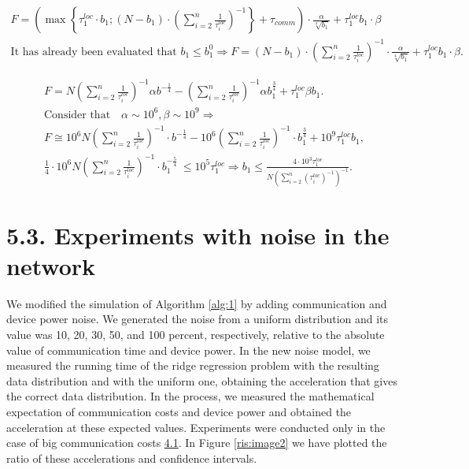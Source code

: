 \documentclass{article}
\theoremstyle{definition}
\theoremstyle{plain}
\begin{document}
\begin{gather*}
    F=\left(\max \left\{\tau_1^{loc} \cdot b_1 ;\left(N-b_1\right) \cdot\left(\sum_{i=2}^n \frac{1}{\tau_i^{loc}}\right)^{-1}\right\}+\tau_{comm}\right) \cdot \frac{\alpha}{\sqrt[4]{b_1}}+\tau_1^{loc} b_1 \cdot \beta \\
    \text {It has already been evaluated that } b_1 \leq b_1^0 \Rightarrow F=\left(N-b_1\right)\cdot \left(\sum_{i=2}^n \frac{1}{\tau_i^{loc}}\right)^{-1} \cdot \frac{\alpha}{\sqrt[4]{b_1}}+\tau_1^{loc} b_1 \cdot \beta.
\end{gather*}


\begin{gather*}
    F=N\left(\sum_{i=2}^n \frac{1}{\tau_i^{loc}}\right)^{-1} \alpha b^{-\frac{1}{4}}-\left(\sum_{i=2}^n \frac{1}{\tau_i^{loc}}\right)^{-1} \alpha b_1^{\frac{3}{4}}+\tau_1^{l o c} \beta b_1. \\
    \text {Consider that} \quad \alpha \sim 10^6, \beta \sim 10^9 \Rightarrow \\ 
    F \cong 10^6 N \left(\sum_{i=2}^n \frac{1}{\tau_i^{loc}}\right)^{-1} \cdot b^{-\frac{1}{4}}-10^6 \left(\sum_{i=2}^n \frac{1}{\tau_i^{loc}}\right)^{-1} \cdot b_1^{\frac{3}{4}}+10^9 \tau_1^{loc} b_1, \\
    \frac{1}{4} \cdot 10^6 N \left(\sum_{i=2}^n \frac{1}{\tau_i^{loc}}\right)^{-1} \cdot b_1^{-\frac{5}{4}} \ \leq 10^5 \tau_1^{loc} \Rightarrow b_1 \leq \frac{4 \cdot 10^3 \tau_1^{loc}}{N\left(\sum_{i=2}^n\left(\tau_i^{loc}\right)^{-1}\right)^{-1}}.
\end{gather*}

\section*{5.3. Experiments with noise in the network}

We modified the simulation of Algorithm \ref{alg:1} by adding communication  and device power noise. We generated the noise from a uniform distribution and its value was 10, 20, 30, 50, and 100 percent, respectively, relative to the absolute value of communication time and device power. In the new noise model, we measured the running time of the ridge regression problem with the resulting data distribution and with the uniform one, obtaining the acceleration that gives the correct data distribution. In the process, we measured the mathematical expectation of communication costs and device power and obtained the acceleration at these expected values. Experiments were conducted only in the case of big communication costs \hyperref[s:4.1]{4.1}. In Figure \ref{ris:image2} we have plotted the ratio of these accelerations and confidence intervals.
\end{document}
